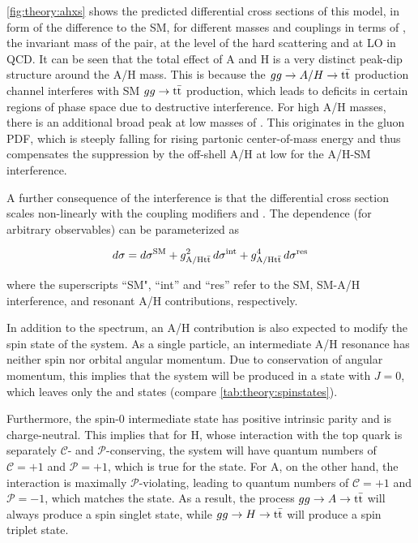 \cref{fig:theory:ahxs} shows the predicted differential cross sections of this model, in form of the difference to the SM, for different masses and couplings in terms of \mtt, the invariant mass of the \ttbar pair, at the level of the hard scattering and at LO in QCD. It can be seen that the total effect of A and H is a very distinct peak-dip structure around the A/H mass. This is because the $gg \rightarrow A/H \rightarrow \mathrm{t \bar{t}}$ production channel interferes with SM $gg \rightarrow \mathrm{t \bar{t}}$ production, which leads to deficits in certain regions of phase space due to destructive interference. For high A/H masses, there is an additional broad peak at low masses of \mtt. This originates in the gluon PDF, which is steeply falling for rising partonic center-of-mass energy and thus compensates the suppression by the off-shell A/H at low \mtt for the A/H-SM interference.

A further consequence of the interference is that the differential cross section scales non-linearly with the coupling modifiers \gAtt and \gHtt. The dependence (for arbitrary observables) can be parameterized as 

\begin{equation}
\label{eq:theory:ahxs}
    d \sigma = d \sigma^{\mathrm{SM}} + g_{\mathrm{A/H t \bar{t}}}^2 \, d \sigma^{\mathrm{int}} + g_{\mathrm{A/H t \bar{t}}}^4 \, d \sigma^{\mathrm{res}}
\end{equation}

\noindent where the superscripts ``SM", ``int'' and ``res'' refer to the SM, SM-A/H interference, and resonant A/H contributions, respectively.

In addition to the \mtt spectrum, an A/H contribution is also expected to modify the spin state of the \ttbar system. As a single particle, an intermediate A/H resonance has neither spin nor orbital angular momentum. Due to conservation of angular momentum, this implies that the \ttbar system will be produced in a state with $J = 0$, which leaves only the  and  states (compare \cref{tab:theory:spinstates}).

Furthermore, the spin-0 intermediate state has positive intrinsic parity and is charge-neutral. This implies that for H, whose interaction with the top quark is separately $\mathcal{C}$- and $\mathcal{P}$-conserving, the \ttbar system will have quantum numbers of $\mathcal{C} = +1$ and $\mathcal{P} = +1$, which is true for the  state. For A, on the other hand, the interaction is maximally $\mathcal{P}$-violating, leading to quantum numbers of $\mathcal{C} = +1$ and $\mathcal{P} = -1$, which matches the  state. As a result, the process $gg \rightarrow A \rightarrow \mathrm{t \bar{t}}$ will always produce a spin singlet state, while $gg \rightarrow H \rightarrow \mathrm{t \bar{t}}$ will produce a spin triplet state.

